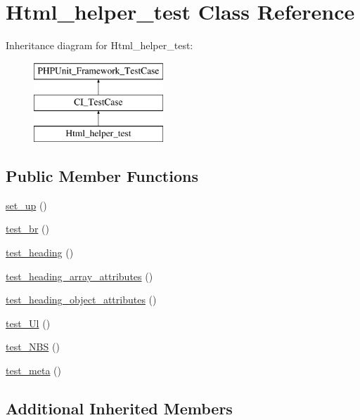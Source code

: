 \hypertarget{class_html__helper__test}{}\section{Html\+\_\+helper\+\_\+test Class Reference}
\label{class_html__helper__test}
Inheritance diagram for Html\+\_\+helper\+\_\+test\+:\begin{figure}[H]
\begin{center}
\leavevmode
\includegraphics[height=3.000000cm]{class_html__helper__test}
\end{center}
\end{figure}
\subsection*{Public Member Functions}
\begin{DoxyCompactItemize}
\item 
\hyperlink{class_html__helper__test_a69829875c8d4b6ce94908445c4155741}{set\+\_\+up} ()
\item 
\hyperlink{class_html__helper__test_a162510b58541839a15b857c30079787a}{test\+\_\+br} ()
\item 
\hyperlink{class_html__helper__test_acd96e12cf7bea4a188daba3a985bf6ea}{test\+\_\+heading} ()
\item 
\hyperlink{class_html__helper__test_a5b3325cfc10a6b36ee79c7d7a958291c}{test\+\_\+heading\+\_\+array\+\_\+attributes} ()
\item 
\hyperlink{class_html__helper__test_a826fb2e6bcf4b5a71b8deb5418ceec86}{test\+\_\+heading\+\_\+object\+\_\+attributes} ()
\item 
\hyperlink{class_html__helper__test_ac545aaf8aef8923b3e94a22d2fa88009}{test\+\_\+\+Ul} ()
\item 
\hyperlink{class_html__helper__test_a6e5bcc1d8873d45146f1ff3cdbc46cab}{test\+\_\+\+N\+B\+S} ()
\item 
\hyperlink{class_html__helper__test_a05fd2180dbf9c2877bf29dfb3f1a26e0}{test\+\_\+meta} ()
\end{DoxyCompactItemize}
\subsection*{Additional Inherited Members}


